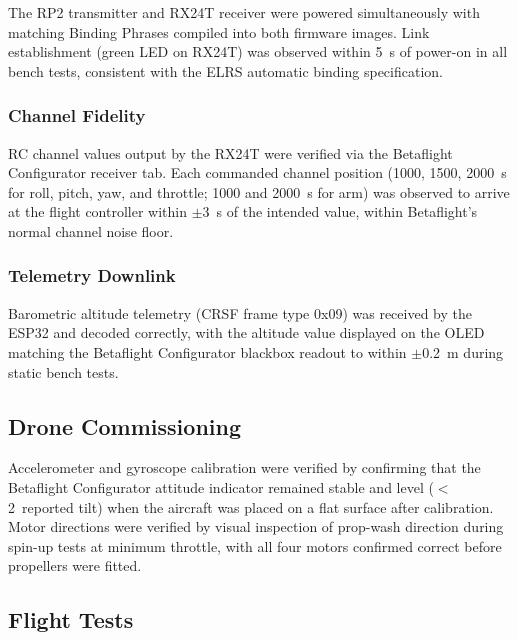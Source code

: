 The RP2 transmitter and RX24T receiver were powered simultaneously with matching Binding
Phrases compiled into both firmware images.
Link establishment (green LED on RX24T) was observed within 5~s of power-on in all bench
tests, consistent with the ELRS automatic binding specification.

\subsubsection{Channel Fidelity}

RC channel values output by the RX24T were verified via the Betaflight Configurator receiver
tab.
Each commanded channel position (1000, 1500, 2000~\textmu s for roll, pitch, yaw, and
throttle; 1000 and 2000~\textmu s for arm) was observed to arrive at the flight controller within
$\pm$3~\textmu s of the intended value, within Betaflight's normal channel noise floor.

\subsubsection{Telemetry Downlink}

Barometric altitude telemetry (CRSF frame type 0x09) was received by the ESP32 and decoded
correctly, with the altitude value displayed on the OLED matching the Betaflight Configurator
blackbox readout to within $\pm$0.2~m during static bench tests.

\subsection{Drone Commissioning}

Accelerometer and gyroscope calibration were verified by confirming that the Betaflight
Configurator attitude indicator remained stable and level ($<$2\textdegree\ reported tilt) when the
aircraft was placed on a flat surface after calibration.
Motor directions were verified by visual inspection of prop-wash direction during spin-up tests
at minimum throttle, with all four motors confirmed correct before propellers were fitted.

\subsection{Flight Tests}


